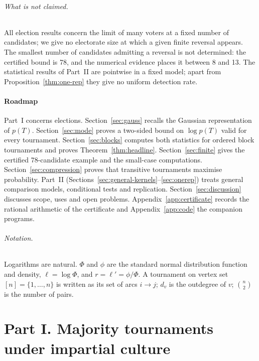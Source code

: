 \documentclass[11pt,a4paper]{article}
\theoremstyle{definition}
\begin{document}
\paragraph{What is not claimed.} All election results concern the limit of many voters at a fixed number of candidates; we give no electorate size at which a given finite reversal appears. The smallest number of candidates admitting a reversal is not determined: the certified bound is 78, and the numerical evidence places it between 8 and 13. The statistical results of Part~II are pointwise in a fixed model; apart from Proposition~\ref{thm:one-rep} they give no uniform detection rate.

\subsection{Roadmap}

Part~I concerns elections. Section~\ref{sec:gauss} recalls the Gaussian representation of $p(T)$. Section~\ref{sec:mode} proves a two-sided bound on $\log p(T)$ valid for every tournament. Section~\ref{sec:blocks} computes both statistics for ordered block tournaments and proves Theorem~\ref{thm:headline}. Section~\ref{sec:finite} gives the certified 78-candidate example and the small-case computations. Section~\ref{sec:compression} proves that transitive tournaments maximise probability. Part~II (Sections~\ref{sec:general-kernels}--\ref{sec:onerep}) treats general comparison models, conditional tests and replication. Section~\ref{sec:discussion} discusses scope, uses and open problems. Appendix~\ref{app:certificate} records the rational arithmetic of the certificate and Appendix~\ref{app:code} the companion programs.

\paragraph{Notation.} Logarithms are natural. $\Phi$ and $\phi$ are the standard normal distribution function and density, $\ell=\log\Phi$, and $r=\ell'=\phi/\Phi$. A tournament on vertex set $[n]=\{1,\dots,n\}$ is written as its set of arcs $i\to j$; $d_v$ is the outdegree of $v$; $\binom{n}{2}$ is the number of pairs.

\part*{Part I. Majority tournaments under impartial culture}
\end{document}
